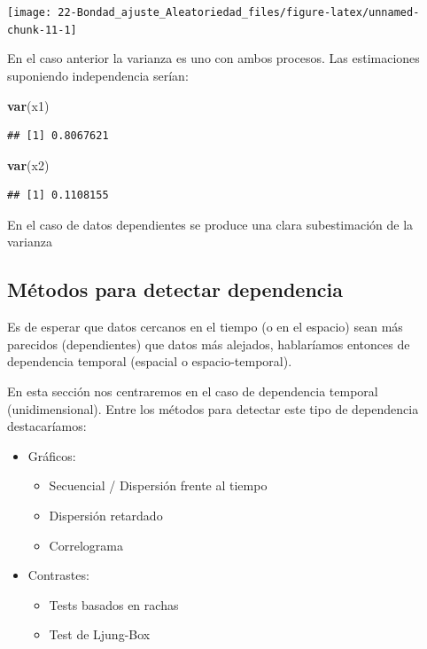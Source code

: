 \documentclass[
]{book}
\newenvironment{Shaded}{\begin{snugshade}}{\end{snugshade}}
\newcommand{\KeywordTok}[1]{\textcolor[rgb]{0.13,0.29,0.53}{\textbf{#1}}}
\newcommand{\NormalTok}[1]{#1}
\theoremstyle{break}
\theoremstyle{definition}
\theoremstyle{definition}
\theoremstyle{definition}
\theoremstyle{remark}
\begin{document}
\begin{center}\texttt{[image: 22-Bondad\_ajuste\_Aleatoriedad\_files/figure-latex/unnamed-chunk-11-1]} \end{center}

En el caso anterior la varianza es uno con ambos procesos.
Las estimaciones suponiendo independencia serían:

\begin{Shaded}
\begin{Highlighting}[]
\KeywordTok{var}\NormalTok{(x1)}
\end{Highlighting}
\end{Shaded}

\begin{verbatim}
## [1] 0.8067621
\end{verbatim}

\begin{Shaded}
\begin{Highlighting}[]
\KeywordTok{var}\NormalTok{(x2)}
\end{Highlighting}
\end{Shaded}

\begin{verbatim}
## [1] 0.1108155
\end{verbatim}

En el caso de datos dependientes se produce una clara subestimación de la varianza

\hypertarget{muxe9todos-para-detectar-dependencia}{%
\subsection{Métodos para detectar dependencia}\label{muxe9todos-para-detectar-dependencia}}

Es de esperar que datos cercanos en el tiempo (o en el espacio)
sean más parecidos (dependientes) que datos más alejados, hablaríamos entonces de dependencia temporal (espacial o espacio-temporal).

En esta sección nos centraremos en el caso de dependencia temporal (unidimensional).
Entre los métodos para detectar este tipo de dependencia destacaríamos:

\begin{itemize}
\item
  Gráficos:

  \begin{itemize}
  \item
    Secuencial / Dispersión frente al tiempo
  \item
    Dispersión retardado
  \item
    Correlograma
  \end{itemize}
\item
  Contrastes:

  \begin{itemize}
  \item
    Tests basados en rachas
  \item
    Test de Ljung-Box
  \end{itemize}
\end{itemize}
\end{document}
